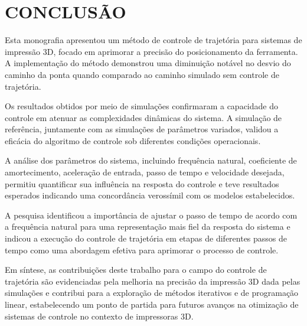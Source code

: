 \chapter{CONCLUSÃO}
Esta monografia apresentou um método de controle de trajetória para sistemas de impressão 3D, focado em aprimorar a precisão do posicionamento da ferramenta. A implementação do método demonstrou uma diminuição notável no desvio do caminho da ponta quando comparado ao caminho simulado sem controle de trajetória.

Os resultados obtidos por meio de simulações confirmaram a capacidade do controle em atenuar as complexidades dinâmicas do sistema. A simulação de referência, juntamente com as simulações de parâmetros variados, validou a eficácia do algoritmo de controle sob diferentes condições operacionais.

A análise dos parâmetros do sistema, incluindo frequência natural, coeficiente de amortecimento, aceleração de entrada, passo de tempo e velocidade desejada, permitiu quantificar sua influência na resposta do controle e teve resultados esperados indicando uma concordância verossímil com os modelos estabelecidos.

A pesquisa identificou a importância de ajustar o passo de tempo de acordo com a frequência natural para uma representação mais fiel da resposta do sistema e indicou a execução do controle de trajetória em etapas de diferentes passos de tempo como uma abordagem efetiva para aprimorar o processo de controle.

Em síntese, as contribuições deste trabalho para o campo do controle de trajetória são evidenciadas pela melhoria na precisão da impressão 3D dada pelas simulações e contribui para a exploração de métodos iterativos e de programação linear, estabelecendo um ponto de partida para futuros avanços na otimização de sistemas de controle no contexto de impressoras 3D.